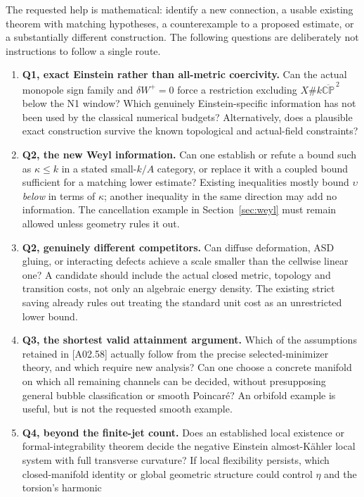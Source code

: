 \documentclass[11pt]{article}
\newcommand{\CP}{\mathbb{CP}}
\newcommand{\sref}[1]{\textsf{[#1]}}
\theoremstyle{remark}
\begin{document}
The requested help is mathematical: identify a new connection, a usable
existing theorem with matching hypotheses, a counterexample to a proposed
estimate, or a substantially different construction. The following questions
are deliberately not instructions to follow a single route.

\begin{enumerate}
\item \textbf{Q1, exact Einstein rather than all-metric coercivity.}
Can the actual monopole sign family and $\delta W^+=0$ force a restriction
excluding $X\#k\overline{\CP}^{\,2}$ below the N1 window? Which genuinely
Einstein-specific information has not been used by the classical numerical
budgets? Alternatively, does a plausible exact construction survive the
known topological and actual-field constraints?
\item \textbf{Q2, the new Weyl information.}
Can one establish or refute a bound such as $\kappa\le k$ in a stated
small-$k/A$ category, or replace it with a coupled bound sufficient for a
matching lower estimate? Existing inequalities mostly bound
$\upsilon$ \emph{below} in terms of $\kappa$; another inequality in the same
direction may add no information. The cancellation example in
Section~\ref{sec:weyl} must remain allowed unless geometry rules it out.
\item \textbf{Q2, genuinely different competitors.}
Can diffuse deformation, ASD gluing, or interacting defects achieve a scale
smaller than the cellwise linear one? A candidate should include the actual
closed metric, topology and transition costs, not only an algebraic energy
density. The existing strict saving already rules out treating the standard
unit cost as an unrestricted lower bound.
\item \textbf{Q3, the shortest valid attainment argument.}
Which of the assumptions retained in \sref{A02.58} actually follow from the
precise selected-minimizer theory, and which require new analysis? Can one
choose a concrete manifold on which all remaining channels can be decided,
without presupposing general bubble classification or smooth Poincar\'e?
An orbifold example is useful, but is not the requested smooth example.
\item \textbf{Q4, beyond the finite-jet count.}
Does an established local existence or formal-integrability theorem decide
the negative Einstein almost-K\"ahler local system with full transverse
curvature? If local flexibility persists, which closed-manifold identity or
global geometric structure could control $\eta$ and the torsion's harmonic

\end{enumerate}
\end{document}
